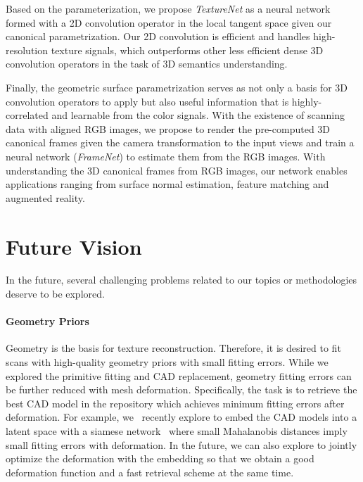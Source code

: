 Based on the parameterization, we propose \emph{TextureNet} as a neural network formed with a 2D convolution operator in the local tangent space given our canonical parametrization.
%
Our 2D convolution is efficient and handles high-resolution texture signals, which outperforms other less efficient dense 3D convolution operators in the task of 3D semantics understanding.

Finally, the geometric surface parametrization serves as not only a basis for 3D convolution operators to apply but also useful information that is highly-correlated and learnable from the color signals. With the existence of scanning data with aligned RGB images, we propose to render the pre-computed 3D canonical frames given the camera transformation to the input views and train a neural network (\emph{FrameNet}) to estimate them from the RGB images. With understanding the 3D canonical frames from RGB images, our network enables applications ranging from surface normal estimation, feature matching and augmented reality. 

\section{Future Vision}
In the future, several challenging problems related to our topics or methodologies deserve to be explored.

\paragraph*{Geometry Priors} Geometry is the basis for texture reconstruction. Therefore, it is desired to fit scans with high-quality geometry priors with small fitting errors. While we explored the primitive fitting and CAD replacement, geometry fitting errors can be further reduced with mesh deformation. Specifically, the task is to retrieve the best CAD model in the repository which achieves minimum fitting errors after deformation. For example, we~\cite{uy2020deformation} recently explore to embed the CAD models into a latent space with a siamese network~\cite{finn2017model} where small Mahalanobis distances imply small fitting errors with deformation. In the future, we can also explore to jointly optimize the deformation with the embedding so that we obtain a good deformation function and a fast retrieval scheme at the same time.

